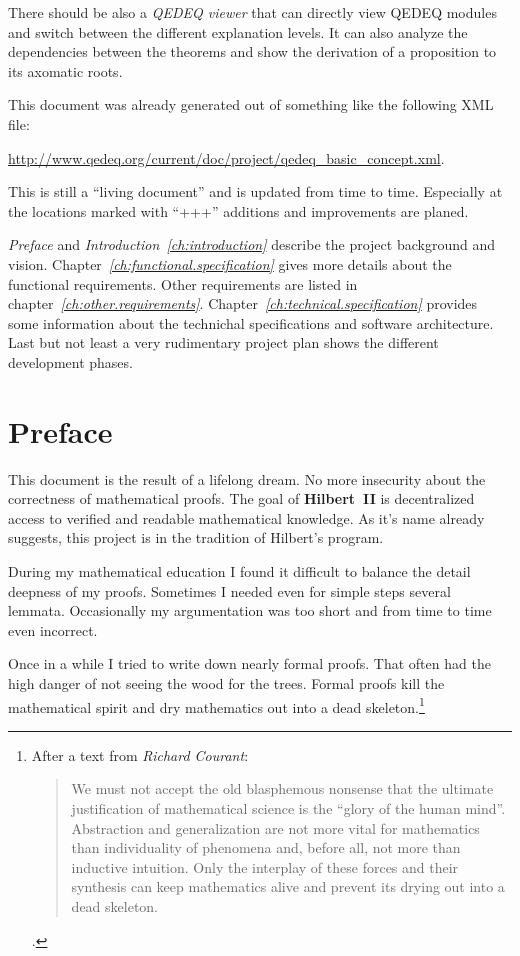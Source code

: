 \documentclass[a4paper,german,10pt,twoside]{book}
\theoremstyle{definition}
\theoremstyle{remark}
\begin{document}
\par
There should be also a \emph{QEDEQ viewer} that can directly view QEDEQ modules and switch between the different explanation levels. It can also analyze the dependencies between the theorems and show the derivation of a proposition to its axomatic roots.
\par
This document was already generated out of something like the following XML file:
\par
\url{http://www.qedeq.org/current/doc/project/qedeq_basic_concept.xml}.
\par
This is still a ``living document'' and is updated from time to time. Especially at the locations marked with ``+++'' additions and improvements are planed.
\par
\emph{Preface} and \emph{Introduction~\ref{ch:introduction}} describe the project background and vision. 
Chapter~\emph{\ref{ch:functional.specification}} gives more details about the functional requirements. Other requirements are listed in chapter~\emph{\ref{ch:other.requirements}}. Chapter~\emph{\ref{ch:technical.specification}} provides some information about the technichal specifications and software architecture.
Last but not least a very rudimentary project plan shows the different development phases.


\chapter*{Preface\label{ch:preface}} \label{chapter1} \hypertarget{chapter1}{}

This document is the result of a lifelong dream. No more insecurity about the correctness of mathematical proofs.
The goal of \textbf{Hilbert~II} is decentralized access to verified and readable mathematical knowledge. As it's name already suggests, this project is in the tradition of Hilbert's program.

\par
During my mathematical education I found it difficult to balance the detail deepness of my proofs. Sometimes I needed even for simple steps several lemmata. Occasionally my argumentation was too short and from time to time even incorrect. 

\par
Once in a while I tried to write down nearly formal proofs. That often had the high danger of not seeing the wood for the trees. Formal proofs kill the mathematical spirit and dry mathematics out into a dead skeleton.\footnote{After a text from \emph{Richard Courant}: 
\begin{quote}
We must not accept the old blasphemous nonsense that the ultimate justification of mathematical science is the ``glory of the human mind''. Abstraction and generalization are not more vital for mathematics than individuality of phenomena and, before all, not more than inductive intuition. Only the interplay of these forces and their synthesis can keep mathematics alive and prevent its drying out into a dead skeleton.
\end{quote}.}
\end{document}
